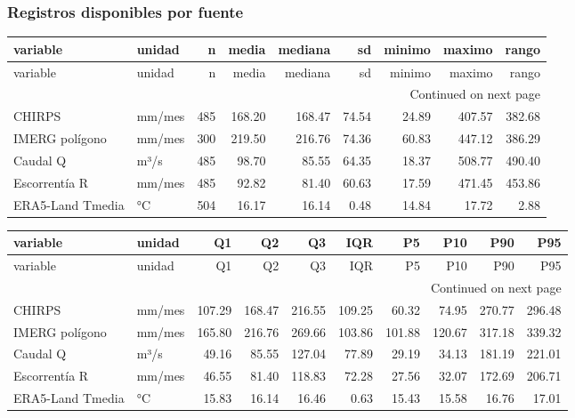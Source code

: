 \documentclass[10pt,a4paper]{article}
\begin{document}
\subsubsection*{Registros disponibles por fuente}
{\scriptsize
\begin{longtable}{llrrrrrrr}
\toprule
variable & unidad & n & media & mediana & sd & minimo & maximo & rango \\
\midrule
\endfirsthead
\toprule
variable & unidad & n & media & mediana & sd & minimo & maximo & rango \\
\midrule
\endhead
\midrule
\multicolumn{9}{r}{Continued on next page} \\
\midrule
\endfoot
\bottomrule
\endlastfoot
CHIRPS & mm/mes & 485 & 168.20 & 168.47 & 74.54 & 24.89 & 407.57 & 382.68 \\
IMERG polígono & mm/mes & 300 & 219.50 & 216.76 & 74.36 & 60.83 & 447.12 & 386.29 \\
Caudal Q & m³/s & 485 & 98.70 & 85.55 & 64.35 & 18.37 & 508.77 & 490.40 \\
Escorrentía R & mm/mes & 485 & 92.82 & 81.40 & 60.63 & 17.59 & 471.45 & 453.86 \\
ERA5-Land Tmedia & °C & 504 & 16.17 & 16.14 & 0.48 & 14.84 & 17.72 & 2.88 \\
\end{longtable}
}
{\scriptsize
\begin{longtable}{llrrrrrrrr}
\toprule
variable & unidad & Q1 & Q2 & Q3 & IQR & P5 & P10 & P90 & P95 \\
\midrule
\endfirsthead
\toprule
variable & unidad & Q1 & Q2 & Q3 & IQR & P5 & P10 & P90 & P95 \\
\midrule
\endhead
\midrule
\multicolumn{10}{r}{Continued on next page} \\
\midrule
\endfoot
\bottomrule
\endlastfoot
CHIRPS & mm/mes & 107.29 & 168.47 & 216.55 & 109.25 & 60.32 & 74.95 & 270.77 & 296.48 \\
IMERG polígono & mm/mes & 165.80 & 216.76 & 269.66 & 103.86 & 101.88 & 120.67 & 317.18 & 339.32 \\
Caudal Q & m³/s & 49.16 & 85.55 & 127.04 & 77.89 & 29.19 & 34.13 & 181.19 & 221.01 \\
Escorrentía R & mm/mes & 46.55 & 81.40 & 118.83 & 72.28 & 27.56 & 32.07 & 172.69 & 206.71 \\
ERA5-Land Tmedia & °C & 15.83 & 16.14 & 16.46 & 0.63 & 15.43 & 15.58 & 16.76 & 17.01 \\
\end{longtable}
}
\end{document}
